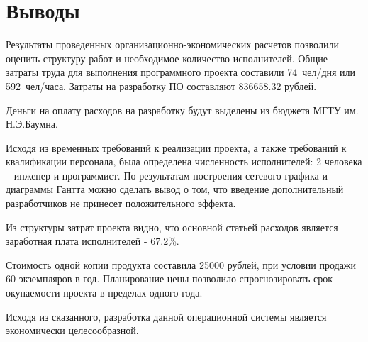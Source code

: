 \clearpage
\section{Выводы}
Результаты проведенных организационно-экономических расчетов позволили оценить структуру работ и необходимое
количество исполнителей. Общие затраты труда для выполнения программного проекта составили 74~чел/дня или 592~чел/часа.
Затраты на разработку ПО составляют 836658.32 рублей.

Деньги на оплату расходов на разработку будут выделены из бюджета МГТУ им. Н.Э.Баумна.

Исходя из временных требований к реализации проекта, а также требований к квалификации персонала, была определена
численность исполнителей: 2 человека -- инженер и программист. По результатам построения сетевого графика и
диаграммы Гантта можно сделать вывод о том, что введение дополнительный разработчиков не принесет положительного эффекта.

Из структуры затрат проекта видно, что основной статьей расходов является заработная плата исполнителей - 67.2\%.

Стоимость одной копии продукта составила 25000 рублей, при условии продажи 60 экземпляров в год.
Планирование цены позволило спрогнозировать срок окупаемости проекта в пределах одного года.

Исходя из сказанного, разработка данной операционной системы является экономически целесообразной.
